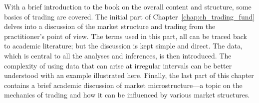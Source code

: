 
With a brief introduction to the book on the overall content and structure, some basics of trading are covered. The initial part of Chapter~\ref{chap:ch_trading_fund} delves into a discussion of the market structure and trading from the practitioner's point of view. The terms used in this part, all can be traced back to academic literature; but the discussion is kept simple and direct. The data, which is central to all the analyses and inferences, is then introduced. The complexity of using data that can arise at irregular intervals can be better understood with an example illustrated here. Finally, the last part of this chapter contains a brief academic discussion of market microstructure---a topic on the mechanics of trading and how it can be influenced by various market structures.